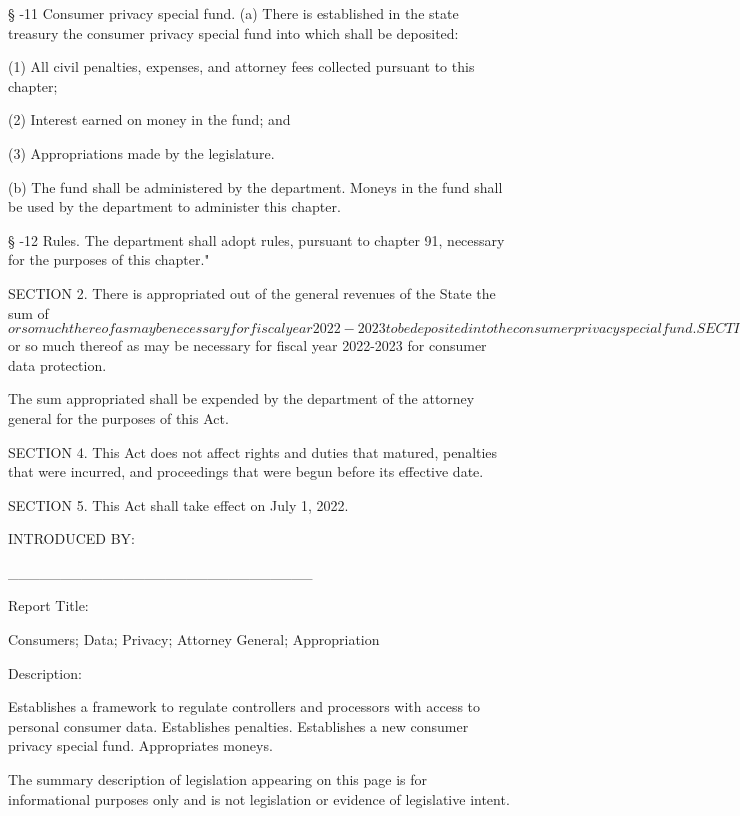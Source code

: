      §   -11  Consumer privacy special fund.  (a) There is established in the state treasury the consumer privacy special fund into which shall be deposited:

     (1)  All civil penalties, expenses, and attorney fees collected pursuant to this chapter;

     (2)  Interest earned on money in the fund; and

     (3)  Appropriations made by the legislature.

     (b)  The fund shall be administered by the department.  Moneys in the fund shall be used by the department to administer this chapter.

     §   -12  Rules.  The department shall adopt rules, pursuant to chapter 91, necessary for the purposes of this chapter."

     SECTION 2.  There is appropriated out of the general revenues of the State the sum of $           or so much thereof as may be necessary for fiscal year 2022-2023 to be deposited into the consumer privacy special fund.

     SECTION 3.  There is appropriated out of the consumer privacy special fund the sum of $           or so much thereof as may be necessary for fiscal year 2022-2023 for consumer data protection.

     The sum appropriated shall be expended by the department of the attorney general for the purposes of this Act.

     SECTION 4.  This Act does not affect rights and duties that matured, penalties that were incurred, and proceedings that were begun before its effective date.

     SECTION 5.  This Act shall take effect on July 1, 2022.

 

INTRODUCED BY:

_____________________________

 

 


 

Report Title:

Consumers; Data; Privacy; Attorney General; Appropriation

 

Description:

Establishes a framework to regulate controllers and processors with access to personal consumer data.  Establishes penalties.  Establishes a new consumer privacy special fund.  Appropriates moneys.

 

 

 

The summary description of legislation appearing on this page is for informational purposes only and is not legislation or evidence of legislative intent.
